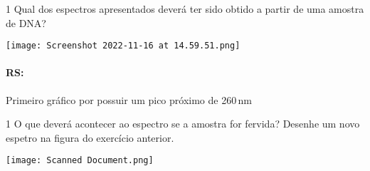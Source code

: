 \documentclass[\mainfilename]{subfiles}
\begin{document}
\begin{questionBox}1{ %
    Qual dos espectros apresentados deverá ter sido obtido a partir de uma amostra de DNA?
} %
    
    \begin{center}
        \texttt{[image: Screenshot 2022-11-16 at 14.59.51.png]}
    \end{center}

    \paragraph*{RS:} Primeiro gráfico por possuir um pico próximo de 260\,\si{\nano\metre}

\end{questionBox}

\begin{questionBox}1{ %
    O que deverá acontecer ao espectro se a amostra for fervida? Desenhe um novo espetro na figura do exercício anterior.
} %

    \begin{center}
        \texttt{[image: Scanned Document.png]}
    \end{center}
    
\end{questionBox}
\end{document}
